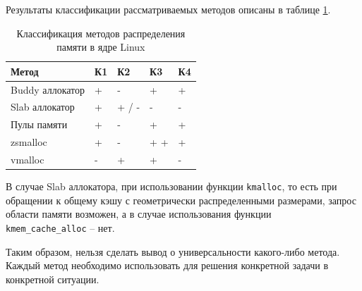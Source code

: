 Результаты классификации рассматриваемых методов описаны в таблице \ref{tbl:comparsion}.

\begin{table}[h]
	\small
	\caption{Классификация методов распределения памяти в ядре Linux}
	\label{tbl:comparsion}
	\begin{center}
	\begin{tabular}{|l|l|l|l|l|}
		\hline
		Метод & К1 & К2 & К3 & К4 \\ \hline
		Buddy аллокатор  & + & - & + & +\\ \hline
		Slab аллокатор & + & + / - & - & -\\ \hline
		Пулы памяти & + & - & + & + \\ \hline
		zsmalloc & + & - & + + & + \\ \hline
		vmalloc & - & + & + & - \\ \hline
	\end{tabular}
\end{center}
\end{table}

В случае Slab аллокатора, при использовании функции \texttt{kmalloc}, то есть при обращении к общему кэшу с геометрически распределенными размерами, запрос области памяти возможен, а в случае использования функции \\ \texttt{kmem\_cache\_alloc} -- нет.

Таким образом, нельзя сделать вывод о универсальности какого-либо метода. Каждый метод необходимо использовать для решения конкретной задачи в конкретной ситуации.

\pagebreak
